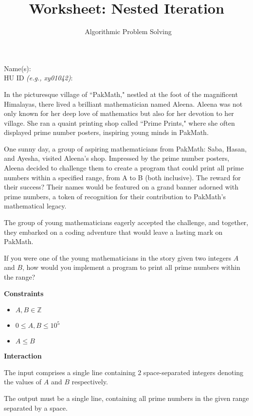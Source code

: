 \documentclass[a4paper]{exam}
\title{Worksheet: Nested Iteration}
\author{\class\ Algorithmic Problem Solving}
\date{\term}
\newcommand\heading[1]{\textbf{#1}}
\begin{document}
\maketitle

Name(s): \hrulefill\\[5pt]
HU ID \textit{\small(e.g., xy01042)}: \hrulefill\\

\begin{questions}


In the picturesque village of ``PakMath," nestled at the foot of the magnificent Himalayas, there lived a brilliant mathematician named Aleena. Aleena was not only known for her deep love of mathematics but also for her devotion to her village. She ran a quaint printing shop called ``Prime Prints," where she often displayed prime number posters, inspiring young minds in PakMath.

One sunny day, a group of aspiring mathematicians from PakMath: Saba, Hasan, and Ayesha, visited Aleena's shop. Impressed by the prime number posters, Aleena decided to challenge them to create a program that could print all prime numbers within a specified range, from A to B (both inclusive). The reward for their success? Their names would be featured on a grand banner adorned with prime numbers, a token of recognition for their contribution to PakMath's mathematical legacy.

The group of young mathematicians eagerly accepted the challenge, and together, they embarked on a coding adventure that would leave a lasting mark on PakMath.

  If you were one of the young mathematicians in the story given two integers $A$ and $B$, how would you implement a program to print all prime numbers within the range?

  \heading{Constraints}
  \begin{itemize}
    \item $A, B \in \mathbb{Z}$
    \item $ 0 \leq A,B \leq 10^{5} $
    \item $A \leq B$
  \end{itemize}

  \heading{Interaction}

  The input comprises a single line containing 2 space-separated integers denoting the values of $A$ and $B$ respectively.

  The output must be a single line, containing all prime numbers in the given range separated by a space.


\end{questions}
\end{document}
